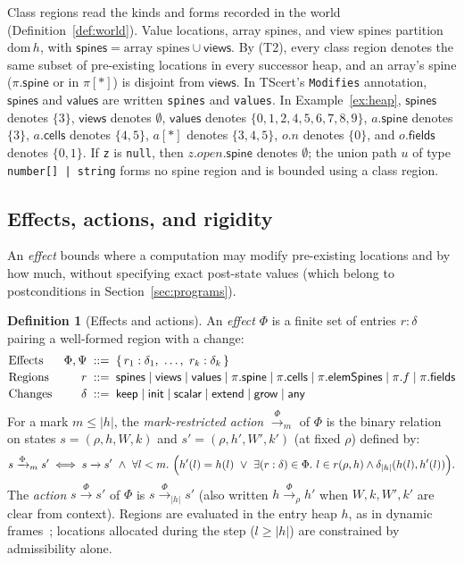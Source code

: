 \documentclass[10pt,a4paper]{article}
\theoremstyle{definition}
\newtheorem{definition}[theorem]{Definition}
\theoremstyle{remark}
\newcommand{\kw}[1]{\mathsf{#1}}
\newcommand{\keep}{\kw{keep}}
\newcommand{\init}{\kw{init}}
\newcommand{\extend}{\kw{extend}}
\newcommand{\grow}{\kw{grow}}
\newcommand{\any}{\kw{any}}
\newcommand{\val}{\kw{values}}
\newcommand{\st}{\kw{spines}}
\newcommand{\vw}{\kw{views}}
\newcommand{\len}[1]{|#1|}
\newcommand{\tr}[1]{\xrightarrow{#1}}
\newcommand{\code}[1]{\texttt{#1}}
\begin{document}
Class regions read the kinds and forms recorded in the world
(Definition~\ref{def:world}). Value locations, array spines, and view
spines partition $\mathrm{dom}\,h$, with $\st=\text{array spines}\cup\vw$.
By (T2), every class region denotes the same subset of pre-existing
locations in every successor heap, and an array's spine ($\pi.\kw{spine}$
or in $\pi[\ast]$) is disjoint from $\vw$. In TScert's \code{Modifies}
annotation, $\st$ and $\val$ are written \code{spines} and \code{values}.
In Example~\ref{ex:heap}, $\st$ denotes $\{3\}$, $\vw$ denotes
$\emptyset$, $\val$ denotes $\{0,1,2,4,5,6,7,8,9\}$, $a.\kw{spine}$
denotes $\{3\}$, $a.\kw{cells}$ denotes $\{4,5\}$, $a[\ast]$ denotes
$\{3,4,5\}$, $o.n$ denotes $\{0\}$, and $o.\kw{fields}$ denotes
$\{0,1\}$. If \code{z} is \code{null}, then $z.\mathit{open}.\kw{spine}$
denotes $\emptyset$; the union path $u$ of type \code{number[] | string}
forms no spine region and is bounded using a class region.

\subsection{Effects, actions, and rigidity}

An \emph{effect} bounds where a computation may modify pre-existing
locations and by how much, without specifying exact post-state values
(which belong to postconditions in Section~\ref{sec:programs}).

\begin{definition}[Effects and actions]\label{def:effects}
An \emph{effect} $\Phi$ is a finite set of entries $r:\delta$ pairing a
well-formed region with a change:
{\small\begin{displaymath}
\begin{array}{@{}l@{\quad}r@{\;\;}c@{\;\;}l@{}}
\text{Effects} & \Phi,\Psi &::=& \{\,r_1:\delta_1,\ \ldots,\ r_k:\delta_k\,\}\\[2pt]
\text{Regions} & r &::=& \st \mid \vw \mid \val \mid \pi.\kw{spine} \mid \pi.\kw{cells} \mid \pi.\kw{elemSpines} \mid \pi.f \mid \pi.\kw{fields}\\[2pt]
\text{Changes} & \delta &::=& \keep\mid\init\mid\kw{scalar}\mid\extend\mid\grow\mid\any
\end{array}
\end{displaymath}}
For a mark $m\le\len h$, the \emph{mark-restricted action} $\tr{\Phi}_m$ of
$\Phi$ is the binary relation on states $s=(\rho,h,W,k)$ and
$s'=(\rho,h',W',k')$ (at fixed $\rho$) defined by:
{\small\begin{displaymath}
s\tr{\Phi}_m s' \iff s\tr{} s'\ \wedge\ \forall l<m.\ \Bigl(h'(l)=h(l)\ \vee\ \exists (r:\delta)\in\Phi.\ l\in r(\rho,h)\wedge\delta_{\len h}(h(l),h'(l))\Bigr).
\end{displaymath}}
The \emph{action} $s\tr{\Phi} s'$ of $\Phi$ is $s\tr{\Phi}_{\len h} s'$
(also written $h\tr{\Phi}_\rho h'$ when $W,k,W',k'$ are clear from
context). Regions are evaluated in the entry heap $h$, as in dynamic
frames~\cite{kassios}; locations allocated during the step ($l\ge\len h$)
are constrained by admissibility alone.
\end{definition}
\end{document}
